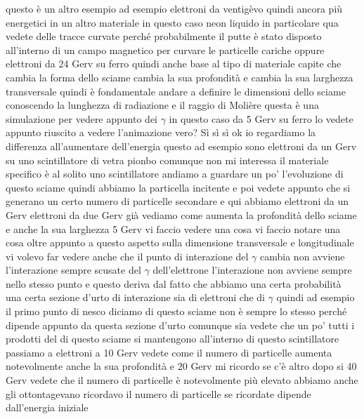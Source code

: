 {questo è un altro esempio ad esempio elettroni da ventigèvo quindi ancora più energetici in un altro materiale in questo caso neon liquido in particolare qua vedete delle tracce curvate perché probabilmente il putte è stato disposto all'interno di un campo magnetico per curvare le particelle cariche oppure elettroni da 24 Gerv su ferro quindi anche base al tipo di materiale capite che cambia la forma dello sciame cambia la sua profondità e cambia la sua larghezza transversale quindi è fondamentale andare a definire le dimensioni dello sciame conoscendo la lunghezza di radiazione e il raggio di Molière questa è una simulazione per vedere appunto dei $\gamma$ in questo caso da 5 Gerv su ferro lo vedete appunto riuscito a vedere l'animazione vero? Sì sì sì ok io regardiamo la differenza all'aumentare dell'energia questo ad esempio sono elettroni da un Gerv su uno scintillatore di vetra pionbo comunque non mi interessa il materiale specifico è al solito uno scintillatore andiamo a guardare un po' l'evoluzione di questo sciame quindi abbiamo la particella incitente e poi vedete appunto che si generano un certo numero di particelle secondare e qui abbiamo elettroni da un Gerv elettroni da due Gerv già vediamo come aumenta la profondità dello sciame e anche la sua larghezza 5 Gerv vi faccio vedere una cosa vi faccio notare una cosa oltre appunto a questo aspetto sulla dimensione transversale e longitudinale vi volevo far vedere anche che il punto di interazione del $\gamma$ cambia non avviene l'interazione sempre scusate del $\gamma$ dell'elettrone l'interazione non avviene sempre nello stesso punto e questo deriva dal fatto che abbiamo una certa probabilità una certa sezione d'urto di interazione sia di elettroni che di $\gamma$ quindi ad esempio il primo punto di nesco diciamo di questo sciame non è sempre lo stesso perché dipende appunto da questa sezione d'urto comunque sia vedete che un po' tutti i prodotti del di questo sciame si mantengono all'interno di questo scintillatore passiamo a elettroni a 10 Gerv vedete come il numero di particelle aumenta notevolmente anche la sua profondità e 20 Gerv mi ricordo se c'è altro dopo si 40 Gerv vedete che il numero di particelle è notevolmente più elevato abbiamo anche gli ottontagevano ricordavo il numero di particelle se ricordate dipende dall'energia iniziale
}